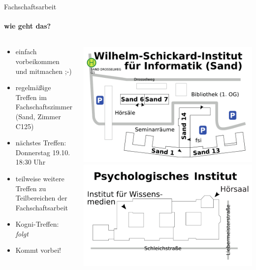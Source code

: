\documentclass{beamer}
\begin{document}
	\begin{frame}{Fachschaftsarbeit}
		\framesubtitle{wie geht das?}
		\begin{columns}
			\begin{column}{.5\linewidth}
				\begin{itemize}
					\item einfach vorbeikommen und mitmachen ;-)
					\item regelmäßige Treffen im Fachschaftszimmer (Sand, Zimmer C125)
					\item nächstes Treffen: \\Donnerstag 19.10. 18:30 Uhr
					\item teilweise weitere Treffen zu Teilbereichen der Fachschaftsarbeit
					\item Kogni-Treffen: \emph{folgt}
					\item Kommt vorbei!
				\end{itemize}
			\end{column}
			\begin{column}{0.5\linewidth}
				\includegraphics[width=\linewidth]{pictures/uebersicht_sand.pdf}\\
				\includegraphics[width=\linewidth]{pictures/uebersicht_pi.pdf}\\
			\end{column}
		\end{columns}
	\end{frame}
	
\end{document}
